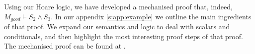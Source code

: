 Using our Hoare logic, we have developed a mechanised proof that, indeed, $M_{good} \vdash S_2 \wedge S_3$.
In our appendix \ref{s:app:example} we outline the main ingredients of that proof. 
We  expand our  semantics and logic to deal with scalars and conditionals, %
and then highlight the most interesting proof steps of that proof.
The mechanised proof can be found at .
